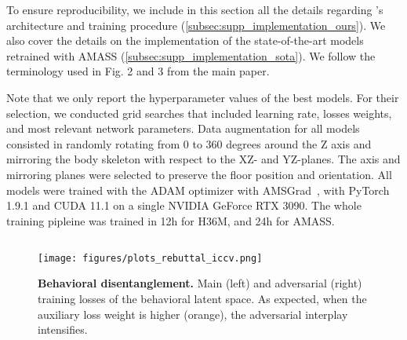 \documentclass[10pt,twocolumn,letterpaper]{article}
\begin{document}
\def\lossrec{\mathcal{L}_{rec}}
\def\losslat{\mathcal{L}_{lat}}

To ensure reproducibility, we include in this section all the details regarding \modelname{}'s architecture and training procedure (\autoref{subsec:supp_implementation_ours}). We also cover the details on the implementation of the state-of-the-art models retrained with AMASS (\autoref{subsec:supp_implementation_sota}). 
We follow the terminology used in Fig. 2 and 3 from the main paper.





Note that we only report the hyperparameter values of the best models. For their selection, we conducted grid searches that included learning rate, losses weights, and most relevant network parameters. Data augmentation for all models consisted in randomly rotating from 0 to 360 degrees around the Z axis and mirroring the body skeleton with respect to the XZ- and YZ-planes. The axis and mirroring planes were selected to preserve the floor position and orientation. All models were trained with the ADAM optimizer with AMSGrad~\cite{reddi2019convergence}, with PyTorch 1.9.1 \cite{paszke2019pytorch} and CUDA 11.1 on a single NVIDIA GeForce RTX 3090. The whole \modelname{} training pipleine was trained in 12h for H36M, and 24h for AMASS.



\subsection{\modelname{}}
\label{subsec:supp_implementation_ours}

\begin{figure}[t!]
    \centering
    \texttt{[image: figures/plots\_rebuttal\_iccv.png]}
    \caption{\textbf{Behavioral disentanglement.} Main (left) and adversarial (right) training losses of the behavioral latent space. As expected, when the auxiliary loss weight is higher (orange), the adversarial interplay intensifies.}
    \label{fig:plots_adv_loss}
\end{figure}
\end{document}
